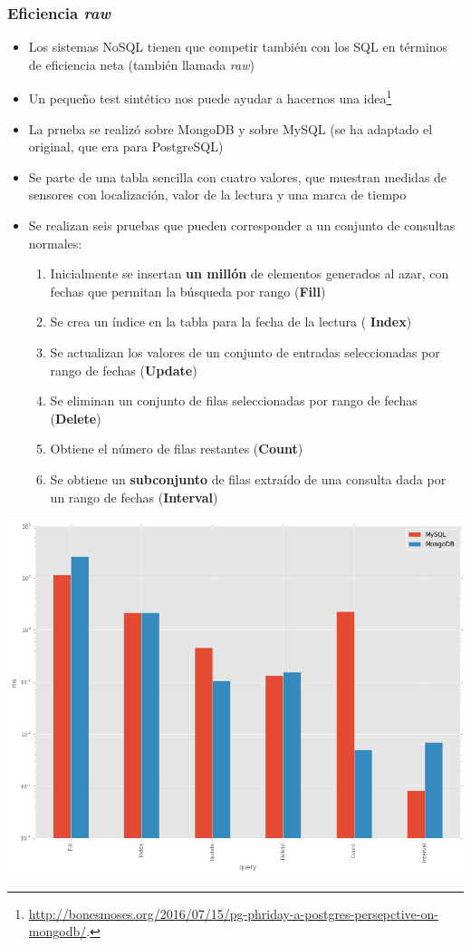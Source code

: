 \documentclass[14pt]{beamer}
\begin{document}
\begin{frame}[allowframebreaks]
  \frametitle{Eficiencia {\em raw}}
  \begin{itemize}
  \item Los sistemas NoSQL tienen que competir también con los SQL en
    términos de eficiencia neta (también llamada {\em raw})
  \item Un pequeño test sintético nos puede ayudar a hacernos una
    idea\footnote{\url{http://bonesmoses.org/2016/07/15/pg-phriday-a-postgres-persepctive-on-mongodb/}.}

\item La prueba se realizó sobre MongoDB y sobre MySQL (se ha adaptado el
  original, que era para PostgreSQL)

  \framebreak

\item Se parte de una tabla sencilla con cuatro valores, que muestran
  medidas de sensores con localización, valor de la lectura y una marca de
  tiempo
  \item Se realizan seis pruebas que pueden corresponder a un conjunto de
    consultas normales:
  \framebreak
  \begin{enumerate}
  \item Inicialmente se insertan {\bf un millón} de elementos generados al
    azar, con fechas que permitan la búsqueda por rango ({\bf Fill})
  \item Se crea un índice en la tabla para la fecha de la lectura ({\bf
      Index})
  \item Se actualizan los valores de un conjunto de entradas seleccionadas
    por rango de fechas ({\bf Update})
  \item Se eliminan un conjunto de filas seleccionadas por rango de fechas
    ({\bf Delete})
  \item Obtiene el número de filas restantes ({\bf Count})
  \item Se obtiene un {\bf subconjunto} de filas extraído de una consulta
    dada por un rango de fechas ({\bf Interval})
  \end{enumerate}

\end{itemize}

\begin{center}
\includegraphics[width=.9\textwidth]{img/mongo_vs_mysql}
\end{center}



\end{frame}
\end{document}
